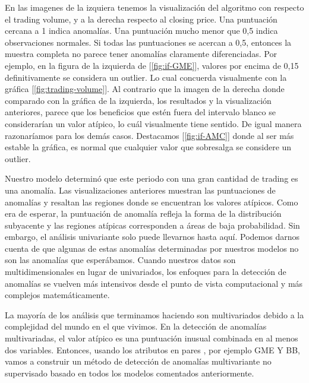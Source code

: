\documentclass[12pt,twoside]{report}
\begin{document}
En las imagenes de la izquiera tenemos la visualización del algoritmo  con respecto el trading volume, y a la derecha respecto al closing price. Una puntuación cercana a 1 indica anomalías. Una puntuación mucho menor que 0,5 indica observaciones normales. Si todas las puntuaciones se acercan a 0,5, entonces la muestra completa no parece tener anomalías claramente diferenciadas. Por ejemplo, en la figura de la izquierda de [\ref{fig:if-GME}], valores por encima de 0,15 definitivamente se considera un outlier. Lo cual concuerda visualmente con la gráfica [\ref{fig:trading-volume}]. Al contrario que la imagen de la derecha donde comparado con la gráfica de la izquierda, los resultados y la visualización anteriores, parece que los beneficios que estén fuera del intervalo blanco se considerarían un valor atípico, lo cuál visualmente tiene sentido. De igual manera razonaríamos para los demás casos. Destacamos [\ref{fig:if-AMC}] donde al ser más estable la gráfica, es normal que cualquier valor que sobresalga se considere un outlier.

Nuestro modelo determinó que este periodo con una gran cantidad de trading es una anomalía. Las visualizaciones anteriores muestran las puntuaciones de anomalías y resaltan las regiones donde se encuentran los valores atípicos. Como era de esperar, la puntuación de anomalía refleja la forma de la distribución subyacente y las regiones atípicas corresponden a áreas de baja probabilidad.
Sin embargo, el análisis univariante solo puede llevarnos hasta aquí. Podemos darnos cuenta de que algunas de estas anomalías determinadas por nuestros modelos no son las anomalías que esperábamos. Cuando nuestros datos son multidimensionales en lugar de univariados, los enfoques para la detección de anomalías se vuelven más intensivos desde el punto de vista computacional y más complejos matemáticamente.

La mayoría de los análisis que terminamos haciendo son multivariados debido a la complejidad del mundo en el que vivimos. En la detección de anomalías multivariadas, el valor atípico es una puntuación inusual combinada en al menos dos variables.
Entonces, usando los atributos en pares , por ejemplo GME Y BB, vamos a construir un método de detección de anomalías multivariante no supervisado basado en todos los modelos comentados anteriormente.
\end{document}
